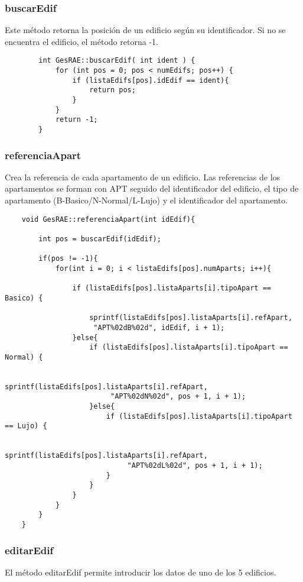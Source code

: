 \documentclass[12pt]{article}
\begin{document}
	\subsubsection{buscarEdif}
	
	Este método retorna la posición de un edificio según su identificador. Si no se encuentra el edificio, el método retorna -1.
	\begin{lstlisting}
		int GesRAE::buscarEdif( int ident ) {
			for (int pos = 0; pos < numEdifs; pos++) {
				if (listaEdifs[pos].idEdif == ident){
					return pos;
				}
			}
			return -1; 
		}
	\end{lstlisting}
	
	\subsubsection{referenciaApart}
	
	Crea la referencia de cada apartamento de un edificio. Las referencias de los apartamentos se forman con APT seguido del identificador del edificio, el tipo de apartamento (B-Basico/N-Normal/L-Lujo) y el identificador del apartamento.
	\begin{lstlisting}
	void GesRAE::referenciaApart(int idEdif){
		
		int pos = buscarEdif(idEdif);
		
		if(pos != -1){
			for(int i = 0; i < listaEdifs[pos].numAparts; i++){
				
				if (listaEdifs[pos].listaAparts[i].tipoApart == Basico) {
					
					sprintf(listaEdifs[pos].listaAparts[i].refApart,
					 "APT%02dB%02d", idEdif, i + 1);
				}else{
					if (listaEdifs[pos].listaAparts[i].tipoApart == Normal) {
						
						sprintf(listaEdifs[pos].listaAparts[i].refApart,
						 "APT%02dN%02d", pos + 1, i + 1);
					}else{
						if (listaEdifs[pos].listaAparts[i].tipoApart == Lujo) {
							
							sprintf(listaEdifs[pos].listaAparts[i].refApart,
							 "APT%02dL%02d", pos + 1, i + 1);
						}
					}
				}
			}
		}
	}
	\end{lstlisting}
	
	\subsubsection{editarEdif}
	
	El método editarEdif permite introducir los datos de uno de los 5 edificios.
	
\end{document}
